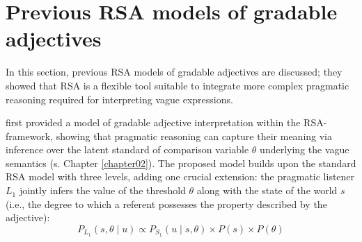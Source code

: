 
\section{Previous RSA models of gradable adjectives}
In this section, previous RSA models of gradable adjectives are discussed; they showed that RSA is a flexible tool suitable to integrate more complex pragmatic reasoning required for interpreting vague expressions.

\textcite{lassiter2013context} first provided a model of gradable adjective interpretation within the RSA-framework, showing that pragmatic reasoning can capture their meaning via inference over the latent standard of comparison variable $\theta$ underlying the vague semantics (s. Chapter \ref{chapter02}). %
The proposed model builds upon the standard RSA model with three levels, adding one crucial extension: the pragmatic listener $L_1$ jointly infers the value of the threshold $\theta$ along with the state of the world $s$ (i.e., the degree to which a referent possesses the property described by the adjective):
\begin{equation}
P_{L_1} (s, \theta \mid u) \propto P_{S_1} (u \mid s, \theta) \times P (s) \times P(\theta)
\end{equation} 

